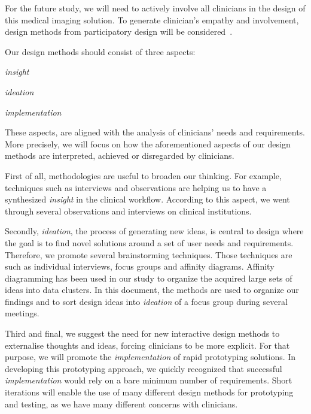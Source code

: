 For the future study, we will need to actively involve all clinicians in the design of this medical imaging solution.
To generate clinician's empathy and involvement, design methods from participatory design will be considered~\cite{10.1145/3025453.3025873}.

\hfill

\noindent
Our design methods should consist of three aspects:

\begin{itemize}
\begin{minipage}{0.3\linewidth}
\item {\it insight}
\end{minipage}
\begin{minipage}{0.3\linewidth}
\item {\it ideation}
\end{minipage}
\begin{minipage}{0.3\linewidth}
\item {\it implementation}
\end{minipage}
\end{itemize}

These aspects, are aligned with the analysis of clinicians' needs and requirements.
More precisely, we will focus on how the aforementioned aspects of our design methods are interpreted, achieved or disregarded by clinicians.

First of all, methodologies are useful to broaden our thinking.
For example, techniques such as interviews and observations are helping us to have a synthesized {\it insight} in the clinical workflow.
According to this aspect, we went through several observations and interviews on clinical institutions.

Secondly, {\it ideation}, the process of generating new ideas, is central to design where the goal is to find novel solutions around a set of user needs and requirements.
Therefore, we promote several brainstorming techniques.
Those techniques are such as individual interviews, focus groups and affinity diagrams.
Affinity diagramming has been used in our study to organize the acquired large sets of ideas into data clusters.
In this document, the methods are used to organize our findings and to sort design ideas into {\it ideation} of a focus group during several meetings.

Third and final, we suggest the need for new interactive design methods to externalise thoughts and ideas, forcing clinicians to be more explicit.
For that purpose, we will promote the {\it implementation} of rapid prototyping solutions.
In developing this prototyping approach, we quickly recognized that successful {\it implementation} would rely on a bare minimum number of requirements.
Short iterations will enable the use of many different design methods for prototyping and testing, as we have many different concerns with clinicians.

